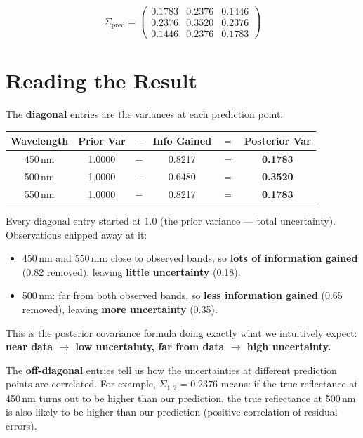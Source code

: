 \documentclass[11pt, a4paper]{article}
\newcommand{\gut}[1]{\begin{tcolorbox}[colback=lightyellow, colframe=orange!50, title=Gut feeling]#1\end{tcolorbox}}
\begin{document}
\begin{equation}
\boxed{
\Sigma_{\text{pred}} =
\begin{pmatrix}
0.1783 & 0.2376 & 0.1446 \\
0.2376 & 0.3520 & 0.2376 \\
0.1446 & 0.2376 & 0.1783
\end{pmatrix}
}
\tag{S6-25}
\end{equation}


\section*{\color{secblue}Reading the Result}

The \textbf{diagonal} entries are the variances at each prediction point:

\begin{center}
\renewcommand{\arraystretch}{1.3}
\begin{tabular}{cccccc}
\toprule
\textbf{Wavelength} & \textbf{Prior Var} & $-$ & \textbf{Info Gained} & $=$ & \textbf{Posterior Var} \\
\midrule
450\,nm & 1.0000 & $-$ & 0.8217 & $=$ & \textbf{0.1783} \\
500\,nm & 1.0000 & $-$ & 0.6480 & $=$ & \textbf{0.3520} \\
550\,nm & 1.0000 & $-$ & 0.8217 & $=$ & \textbf{0.1783} \\
\bottomrule
\end{tabular}
\end{center}

\gut{
Every diagonal entry started at 1.0 (the prior variance --- total uncertainty). Observations chipped away at it:
\begin{itemize}
\item 450\,nm and 550\,nm: close to observed bands, so \textbf{lots of information gained} (0.82 removed), leaving \textbf{little uncertainty} (0.18).
\item 500\,nm: far from both observed bands, so \textbf{less information gained} (0.65 removed), leaving \textbf{more uncertainty} (0.35).
\end{itemize}
This is the posterior covariance formula doing exactly what we intuitively expect: \textbf{near data $\rightarrow$ low uncertainty, far from data $\rightarrow$ high uncertainty.}
}

\bigskip
The \textbf{off-diagonal} entries tell us how the uncertainties at different prediction points are correlated. For example, $\Sigma_{1,2} = 0.2376$ means: if the true reflectance at 450\,nm turns out to be higher than our prediction, the true reflectance at 500\,nm is also likely to be higher than our prediction (positive correlation of residual errors).
\end{document}

